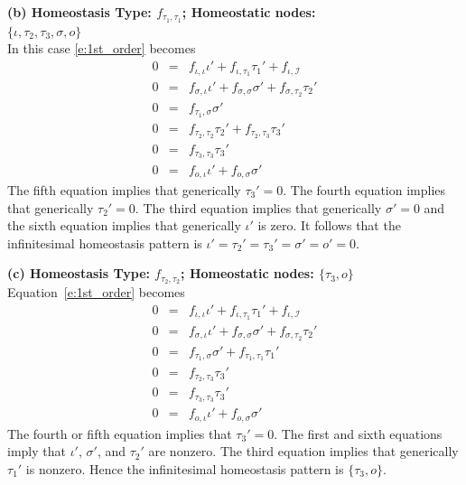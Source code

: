\documentclass[a4paper,fleqn]{cas-dc}
\newcommand{\II}{{\mathcal I}}
\begin{document}
\noindent
\textbf{(b) Homeostasis Type: $f_{\tau_1,\tau_1}$; 
Homeostatic nodes: \\ $\{ \iota, \tau_2, \tau_3, \sigma, o\}$} \\
In this case \eqref{e:1st_order} becomes
\begin{equation}  \label{e:1st_orderB}
\begin{array}{rcl}
0 & = & f_{\iota,\iota}\iota' + f_{\iota,\tau_1}\tau_1' + f_{\iota,\II} \\
0 & = & f_{\sigma,\iota}\iota' + f_{\sigma,\sigma}\sigma' + f_{\sigma,\tau_2}\tau_2' \\
0 & = & f_{\tau_1,\sigma}\sigma'  \\
0 & = & f_{\tau_2,\tau_2}\tau_2' + f_{\tau_2,\tau_3}\tau_3' \\
0 & = & f_{\tau_3,\tau_3}\tau_3'\\
0 & = & f_{o,\iota}\iota' + f_{o,\sigma}\sigma'
\end{array}
\end{equation}
The fifth equation implies that generically $\tau_3' = 0$.  The fourth equation implies that generically $\tau_2'=0$. The third equation implies that generically $\sigma' = 0$ and the sixth equation implies that generically $\iota'$ is zero.
 It follows that the infinitesimal homeostasis pattern is  $\iota' =\tau_2' = \tau_3' = \sigma'  = o' = 0$.

\medskip

\noindent
\textbf{(c) Homeostasis Type: $f_{\tau_2,\tau_2}$; 
Homeostatic nodes: $\{\tau_3,o\}$}  \\
Equation~\eqref{e:1st_order} becomes
\begin{equation}  \label{e:1st_orderC}
\begin{array}{rcl}
0 & = & f_{\iota,\iota}\iota' + f_{\iota,\tau_1}\tau_1' + f_{\iota,\II} \\
0 & = & f_{\sigma,\iota}\iota' + f_{\sigma,\sigma}\sigma' + f_{\sigma,\tau_2}\tau_2' \\
0 & = & f_{\tau_1,\sigma}\sigma' + f_{\tau_1,\tau_1}\tau_1' \\
0 & = &  f_{\tau_2,\tau_3}\tau_3' \\
0 & = & f_{\tau_3,\tau_3}\tau_3'\\
0 & = & f_{o,\iota}\iota' + f_{o,\sigma}\sigma'
\end{array}
\end{equation}
The fourth or fifth equation implies that $\tau_3' = 0$. The first and sixth equations imply that $\iota'$, $\sigma'$, and $\tau_2'$  are nonzero. The third equation implies that generically $\tau_1'$ is nonzero.  Hence the 
infinitesimal homeostasis pattern is $\{\tau_3,o\}$.
\end{document}
